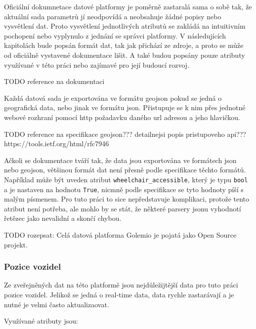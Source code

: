 \bigbreak

Oficiální dokumnetace datové platformy je poměrně zastaralá sama o sobě tak, že aktuální sada parametrů jí neodpovídá a neobsahuje žádné popisy nebo vysvětlení dat. Proto vysvětlení jednotlivých atributů se zakládá na intuitivním pochopení nebo vyplynulo z jednání se správci platformy. V následujících kapitolách bude popsán formát dat, tak jak přichází ze zdroje, a proto se může od oficiálně vystavené dokumentace lišit. A také budou popsány pouze atributy využívané v této práci nebo zajímavé pro její budoucí rozvoj.

TODO reference na dokumentaci

\bigbreak

Každá datová sada je exportována ve formátu \gls{geojson} pokud se jedná o geografická data, nebo jinak ve formátu \gls{json}. Přistupuje se k nim přes jednotné webové rozhraní pomocí \gls{http} požadavku daného \gls{url} adresou a jeho hlavičkou.

TODO reference na specifikace geojson??? detailnejsi popis pristupoveho api??? https://tools.ietf.org/html/rfc7946

\bigbreak

Ačkoli se dokumentace tváří tak, že data jsou exportována ve formátech \gls{json} nebo \gls{geojson}, většinou formát dat není přesně podle specifikace těchto formátů. Například může být uveden atribut \verb"wheelchair_accessible", který je typu \verb"bool" a je nastaven na hodnotu \verb"True", nicmně podle specifikace se tyto hodnoty píší s malým písmenem. Pro tuto práci to sice nepředstavuje komplikaci, protože tento atribut není potřeba, ale mohlo by se stát, že některé parsery \gls{json}u vyhodnotí řetězec jako nevalidní a skončí chybou.

\bigbreak

TODO rozepsat: Celá datová platforma Golemio je pojatá jako Open Source projekt.

\subsubsection{Pozice vozidel}

Ze zveřejněných dat na této platformě jsou nejdůležijtější data pro tuto práci pozice vozidel. Jelikož se jedná o real-time data, data rychle zastarávají a je nutné je velmi často aktualizaovat.

\bigbreak

Využívané atributy jsou:

